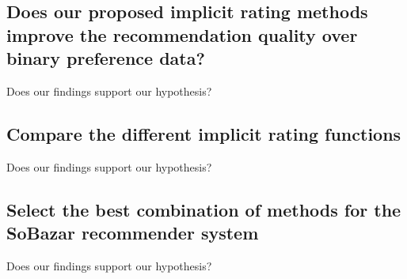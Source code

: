 \subsection{Does our proposed implicit rating methods improve the recommendation quality over binary preference data?}

Does our findings support our hypothesis?



\subsection{Compare the different implicit rating functions}

Does our findings support our hypothesis?

\subsection{Select the best combination of methods for the SoBazar recommender system}

Does our findings support our hypothesis?

